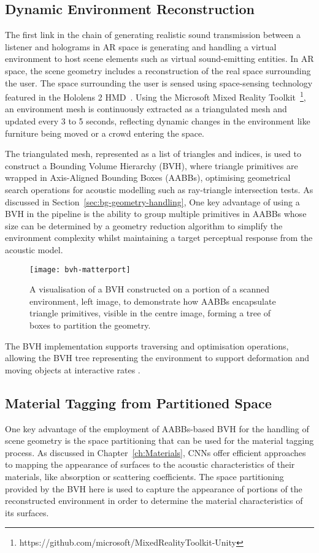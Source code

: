 \subsection{Dynamic Environment Reconstruction}
The first link in the chain of generating realistic sound transmission between a listener and holograms in AR space is generating and handling a virtual environment to host scene elements such as virtual sound-emitting entities. In AR space, the scene geometry includes a reconstruction of the real space surrounding the user. The space surrounding the user is sensed using space-sensing technology featured in the Hololens 2 HMD~\citep{ungureanu2020hololens}. Using the Microsoft Mixed Reality Toolkit~\footnote{https://github.com/microsoft/MixedRealityToolkit-Unity}, an environment mesh is continuously extracted as a triangulated mesh and updated every 3 to 5 seconds, reflecting dynamic changes in the environment like furniture being moved or a crowd entering the space.\par
The triangulated mesh, represented as a list of triangles and indices, is used to construct a Bounding Volume Hierarchy (BVH), where triangle primitives are wrapped in Axis-Aligned Bounding Boxes (AABBs), optimising geometrical search operations for acoustic modelling such as ray-triangle intersection tests. As discussed in Section~\ref{sec:bg-geometry-handling}, One key advantage of using a BVH in the pipeline is the ability to group multiple primitives in AABBs whose size can be determined by a geometry reduction algorithm to simplify the environment complexity whilst maintaining a target perceptual response from the acoustic model. \par
\begin{figure}[htb]
    \centering
    \texttt{[image: bvh-matterport]}
    \caption{A visualisation of a BVH constructed on a portion of a scanned environment, left image, to demonstrate how AABBs encapsulate triangle primitives, visible in the centre image, forming a tree of boxes to partition the geometry.}
\label{fig:bvh-visualisation}
\end{figure}
The BVH implementation supports traversing and optimisation operations, allowing the BVH tree representing the environment to support deformation and moving objects at interactive rates \cite{wald2007ray}.

\subsection{Material Tagging from Partitioned Space}
One key advantage of the employment of AABBs-based BVH for the handling of scene geometry is the space partitioning that can be used for the material tagging process. As discussed in Chapter~\ref{ch:Materials}, CNNs offer efficient approaches to mapping the appearance of surfaces to the acoustic characteristics of their materials, like absorption or scattering coefficients. The space partitioning provided by the BVH here is used to capture the appearance of portions of the reconstructed environment in order to determine the material characteristics of its surfaces.\par

